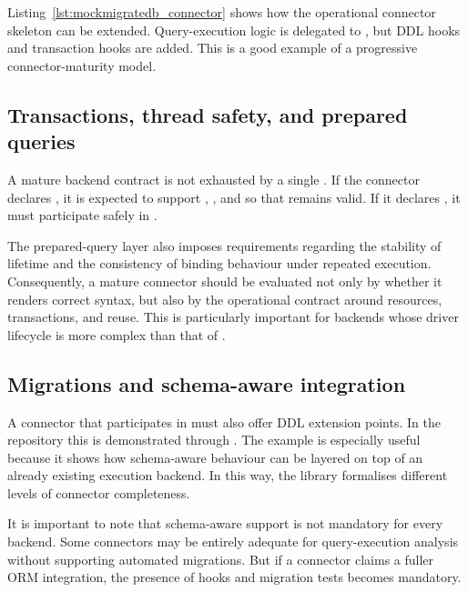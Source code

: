 Listing~\ref{lst:mockmigratedb_connector} shows how the operational connector skeleton can be extended. Query-execution logic is delegated to , but DDL hooks and transaction hooks are added. This is a good example of a progressive connector-maturity model.

\subsection{Transactions, thread safety, and prepared queries}

A mature backend contract is not exhausted by a single . If the connector declares , it is expected to support , , and  so that  remains valid. If it declares , it must participate safely in .

The prepared-query layer also imposes requirements regarding the stability of  lifetime and the consistency of binding behaviour under repeated execution. Consequently, a mature connector should be evaluated not only by whether it renders correct syntax, but also by the operational contract around resources, transactions, and reuse. This is particularly important for backends whose driver lifecycle is more complex than that of .

\subsection{Migrations and schema-aware integration}

A connector that participates in  must also offer DDL extension points. In the repository this is demonstrated through . The example is especially useful because it shows how schema-aware behaviour can be layered on top of an already existing execution backend. In this way, the library formalises different levels of connector completeness.

It is important to note that schema-aware support is not mandatory for every backend. Some connectors may be entirely adequate for query-execution analysis without supporting automated migrations. But if a connector claims a fuller ORM integration, the presence of  hooks and migration tests becomes mandatory.

